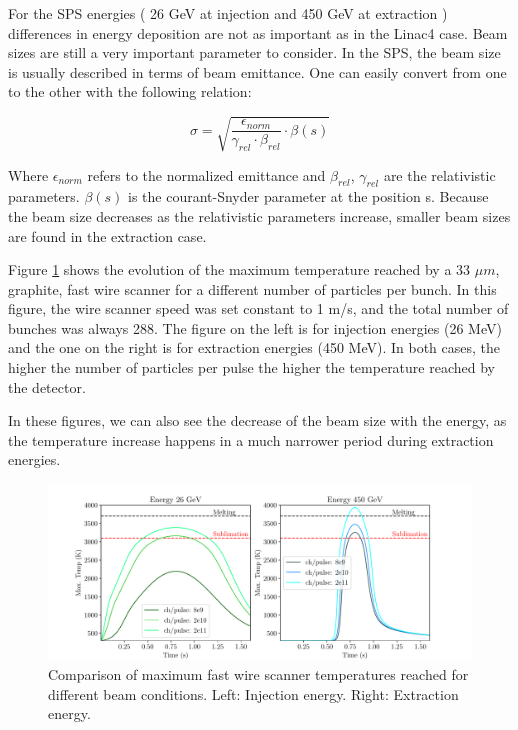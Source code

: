 For the SPS energies ( 26 GeV at injection and 450 GeV at extraction ) differences in energy deposition are not as important as in the Linac4 case. Beam sizes are still a very important parameter to consider. In the SPS, the beam size is usually described in terms of beam emittance. One can easily convert from one to the other with the following relation: 

\begin{equation}
    \sigma = \sqrt{\frac{\epsilon_{norm}}{\gamma_{rel} \cdot \beta_{rel}} \cdot \beta(s)}
\end{equation}

Where $\epsilon_{norm}$ refers to the normalized emittance and $\beta_{rel}$, $\gamma_{rel}$ are the relativistic parameters. $\beta(s)$ is the courant-Snyder parameter at the position s. Because the beam size decreases as the relativistic parameters increase, smaller beam sizes are found in the extraction case. 

Figure \ref{fig:WireScanner1} shows the evolution of the maximum temperature reached by a 33 $\mu m$, graphite, fast wire scanner for a different number of particles per bunch. In this figure, the wire scanner speed was set constant to 1 m/s, and the total number of bunches was always 288.  The figure on the left is for injection energies (26 MeV) and the one on the right is for extraction energies (450 MeV). In both cases, the higher the number of particles per pulse the higher the temperature reached by the detector. 

In these figures, we can also see the decrease of the beam size with the energy, as the temperature increase happens in a much narrower period during extraction energies. 

\begin{figure}[h]
    \centering
    \includegraphics[width=1.0\columnwidth]{WireScanner_Limits/WireLim1.pdf}
    \caption{Comparison of maximum fast wire scanner temperatures reached for different beam conditions. Left: Injection energy. Right: Extraction energy.}
    \label{fig:WireScanner1}
\end{figure}

